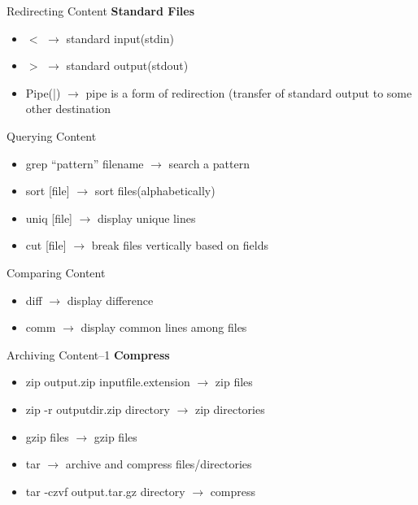 \begin{frame}[t]{Redirecting Content}
\textbf{Standard Files}	
	\begin{itemize}
		\item $<$  $\rightarrow$ standard input(stdin)
		\item $>$ $\rightarrow$ standard output(stdout)
		\item Pipe(|) $\rightarrow$  pipe is a form of redirection (transfer of 
		standard output to some other destination
	\end{itemize}	
 
\end{frame}

\begin{frame}[t]{Querying Content}
	\begin{itemize}
		\item grep “pattern” filename $\rightarrow$ search a 
		pattern		
		\item sort [file] $\rightarrow$ sort files(alphabetically)
		\item uniq [file] $\rightarrow$ display unique lines
		\item cut [file] $\rightarrow$ break files vertically based on fields	
	\end{itemize}
\end{frame}

\begin{frame}[t]{Comparing Content}
	\begin{itemize}
		\item diff $\rightarrow$ display difference	
		\item comm $\rightarrow$ display common lines among files	
	\end{itemize}
\end{frame}

\begin{frame}[t]{Archiving Content--1}
	\textbf{Compress}
	\begin{itemize}
		\item zip output.zip inputfile.extension $\rightarrow$ 
		zip files	
		\item zip -r outputdir.zip directory $\rightarrow$ 
		zip directories
		\item gzip files	$\rightarrow$ gzip files	
		\item tar	$\rightarrow$ archive and compress files/directories
		\item tar -czvf output.tar.gz directory	$\rightarrow$ compress
	\end{itemize}
\end{frame}


